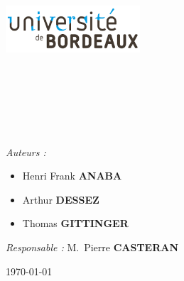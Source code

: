 
\begin{titlepage}

\begin{center}

\begin{minipage}[t]{0.48\textwidth}
  \begin{flushleft}
    \includegraphics [width=50mm]{./images/index.png} \\[0.5cm]
  \end{flushleft}
\end{minipage}
\begin{minipage}[t]{0.48\textwidth}
  \begin{flushright}
  \end{flushright}
\end{minipage} \\[1.5cm]

\textsc{\Large \reportsubject}\\[0.5cm]
\HRule \\[0.4cm]
{\huge \bfseries \reporttitle}\\[0.4cm]
\HRule \\[1.5cm]

\begin{minipage}[t]{0.6\textwidth}
  \begin{flushleft} \large
    \emph{Auteurs :}
    \begin{itemize}
\item Henri Frank \textbf{ANABA}\\ 
\item Arthur \textbf{DESSEZ}\\
\item Thomas \textbf{GITTINGER}\\
\end{itemize}
   
  \end{flushleft}
\end{minipage}

\hfill

\vfill

\vfill

\vfill

\vfill

\begin{minipage}[t]{0.99\textwidth}
  \begin{flushleft} \large
    \emph{Responsable :} 
    M.~Pierre \textbf{CASTERAN}
  \end{flushleft}
\end{minipage}

\vfill


{\today}

\end{center}

\end{titlepage}

